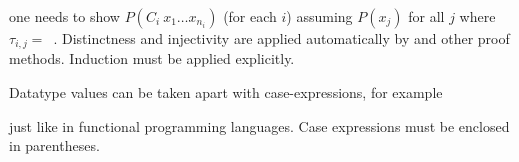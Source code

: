 \begin{isabellebody}
\begin{isamarkuptext}
one needs to show $P(C_i\ x_1 \dots x_{n_i})$ (for each $i$) assuming
$P(x_j)$ for all $j$ where $\tau_{i,j} =$~.
Distinctness and injectivity are applied automatically by 
and other proof methods. Induction must be applied explicitly.

Datatype values can be taken apart with case-expressions, for example
\begin{quote}
\end{quote}
just like in functional programming languages. Case expressions
must be enclosed in parentheses.


\end{isamarkuptext}
\end{isabellebody}
